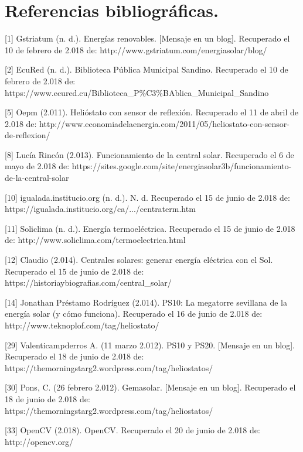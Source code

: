 

\tableofcontents
\pagebreak


\section{Referencias bibliográficas.}

[1] Gstriatum (n. d.). Energías renovables. [Mensaje en un blog]. Recuperado el 10 de febrero de 2.018 de: http://www.gstriatum.com/energiasolar/blog/

[2] EcuRed (n. d.). Biblioteca Pública Municipal Sandino. Recuperado el 10 de febrero de 2.018 de: https://www.ecured.cu/Biblioteca\_P\%C3\%BAblica\_Municipal\_Sandino

[5] Oepm (2.011). Helióstato con sensor de reflexión. Recuperado el 11 de abril de 2.018 de: http://www.economiadelaenergia.com/2011/05/heliostato-con-sensor-de-reflexion/

[8] Lucía Rincón (2.013). Funcionamiento de la central solar. Recuperado el 6 de mayo de 2.018 de: https://sites.google.com/site/energiasolar3b/funcionamiento-de-la-central-solar

[10] igualada.institucio.org (n. d.). N. d. Recuperado el 15 de junio de 2.018 de: https://igualada.institucio.org/ca/.../centraterm.htm

[11] Soliclima (n. d.). Energía termoeléctrica. Recuperado el 15 de junio de 2.018 de: http://www.soliclima.com/termoelectrica.html

[12] Claudio (2.014). Centrales solares: generar energía eléctrica con el Sol. Recuperado el 15 de junio de 2.018 de: https://historiaybiografias.com/central\_solar/

[14] Jonathan Préstamo Rodríguez (2.014). PS10: La megatorre sevillana de la energía solar (y cómo funciona). Recuperado el 16 de junio de 2.018 de: http://www.teknoplof.com/tag/heliostato/

[29] Valenticampderros A. (11 marzo 2.012). PS10 y PS20. [Mensaje en un blog]. Recuperado el 18 de junio de 2.018 de: https://themorningstarg2.wordpress.com/tag/heliostatos/

[30] Pons, C. (26 febrero 2.012). Gemasolar. [Mensaje en un blog]. Recuperado el 18 de junio de 2.018 de: https://themorningstarg2.wordpress.com/tag/heliostatos/

[33] OpenCV (2.018). OpenCV. Recuperado el 20 de junio de 2.018 de: http://opencv.org/

